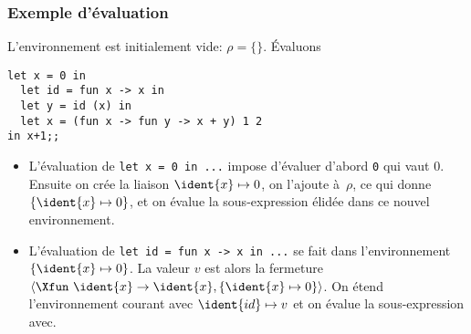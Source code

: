 %
\begin{frame}[containsverbatim]
\frametitle{Exemple d'évaluation}
\label{exemple_eval_informelle}

L'environnement est initialement vide: $\rho = \{\}$. Évaluons
{\small
\begin{verbatim}
let x = 0 in
  let id = fun x -> x in
  let y = id (x) in
  let x = (fun x -> fun y -> x + y) 1 2 
in x+1;;
\end{verbatim}
}
\begin{itemize}

  \item L'évaluation de {\small \verb|let x = 0 in ...|} impose
    d'évaluer d'abord \texttt{0} qui vaut $0$. Ensuite on crée la
    liaison $\ident{x} \mapsto 0$, on l'ajoute à~$\rho$, ce qui donne
    $\{\ident{x} \mapsto 0\}$, et on évalue la sous-expression élidée
    dans ce nouvel environnement.

  \item L'évaluation de {\small \verb|let id = fun x -> x in ...|} se
    fait dans l'environnement $\{\ident{x} \mapsto 0\}$. La valeur $v$
    est alors la fermeture $\langle\Xfun \,\, \ident{x} \rightarrow
    \ident{x}, \{\ident{x} \mapsto 0\}\rangle$. On étend
    l'environnement courant avec $\ident{id} \mapsto v$ et on évalue
    la sous-expression avec.

\end{itemize}

\end{frame}

